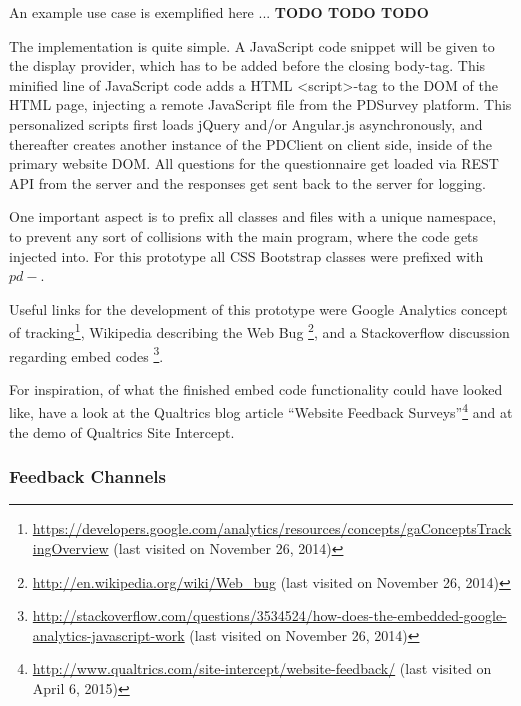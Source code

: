 		An example use case is exemplified here ... \textbf{TODO TODO TODO}
		


		The implementation is quite simple. A JavaScript code snippet will be given to the display provider, which has to be added before the closing body-tag. This minified line of JavaScript code adds a HTML <script>-tag to the DOM of the HTML page, injecting a remote JavaScript file from the PDSurvey platform. This personalized scripts first loads jQuery and/or Angular.js asynchronously, and thereafter creates another instance of the PDClient on client side, inside of the primary website DOM. All questions for the questionnaire get loaded via REST API from the server and the responses get sent back to the server for logging.


		One important aspect is to prefix all classes and files with a unique namespace, to prevent any sort of collisions with the main program, where the code gets injected into. For this prototype all CSS Bootstrap classes were prefixed with $pd-$.

		Useful links for the development of this prototype were Google Analytics concept of tracking\footnote{\url{https://developers.google.com/analytics/resources/concepts/gaConceptsTrackingOverview} (last visited on November 26, 2014)}, Wikipedia describing the Web Bug \footnote{\url{http://en.wikipedia.org/wiki/Web_bug} (last visited on November 26, 2014)}, and a Stackoverflow discussion regarding embed codes \footnote{\url{http://stackoverflow.com/questions/3534524/how-does-the-embedded-google-analytics-javascript-work} (last visited on November 26, 2014)}.

		For inspiration, of what the finished embed code functionality could have looked like, have a look at the Qualtrics blog article ``Website Feedback Surveys''\footnote{\url{http://www.qualtrics.com/site-intercept/website-feedback/} (last visited on April 6, 2015)} and at the demo of Qualtrics Site Intercept.



	\subsubsection{Feedback Channels}


